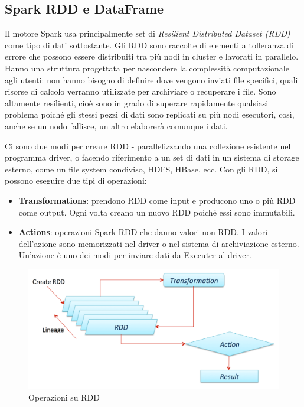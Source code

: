\subsection{Spark RDD e DataFrame} \label{rdd_df}
Il motore Spark usa principalmente set di \textit{Resilient Distributed Dataset (RDD)} come tipo di dati sottostante. Gli RDD sono raccolte di elementi a tolleranza di errore che possono essere distribuiti tra più nodi in cluster e lavorati in parallelo. Hanno una struttura progettata per nascondere la complessità computazionale agli utenti: non hanno bisogno di definire dove vengono inviati file specifici, quali risorse di calcolo verranno utilizzate per archiviare o recuperare i file. Sono altamente resilienti, cioè sono in grado di superare rapidamente qualsiasi problema poiché gli stessi pezzi di dati sono replicati su più nodi esecutori, così, anche se un nodo fallisce, un altro elaborerà comunque i dati.

Ci sono due modi per creare RDD - parallelizzando una collezione esistente nel programma driver, o facendo riferimento a un set di dati in un sistema di storage esterno, come un file system condiviso, HDFS, HBase, ecc. Con gli RDD, si possono eseguire due tipi di operazioni:
\begin{itemize}
    \item \textbf{Transformations}: prendono RDD come input e producono uno o più RDD come output. Ogni volta creano un nuovo RDD poiché essi sono immutabili. 
    \item \textbf{Actions}: operazioni Spark RDD che danno valori non RDD. I valori dell'azione sono memorizzati nel driver o nel sistema di archiviazione esterno. Un'azione è uno dei modi per inviare dati da Executer al driver.
\end{itemize}
\begin{figure}[hbt!]
    \centering
    \includegraphics[width=1\textwidth]{img/spark_rdd.png}
    \caption{Operazioni su RDD}
    \label{fig:spark_rdd}
\end{figure}

